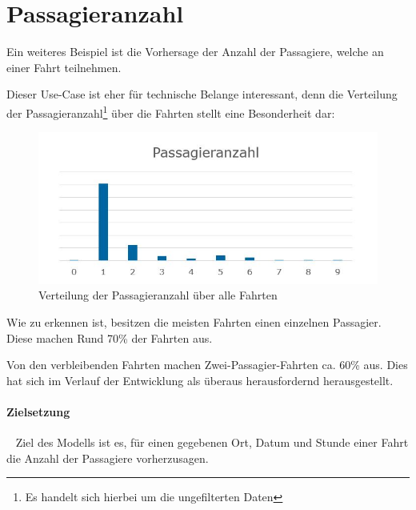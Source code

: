 \section{Passagieranzahl}
\label{sec:PasPred}
Ein weiteres Beispiel ist die Vorhersage der Anzahl der Passagiere, welche an einer Fahrt teilnehmen. 

Dieser Use-Case ist eher für technische Belange interessant, denn die Verteilung der Passagieranzahl\footnote{Es handelt sich hierbei um die ungefilterten Daten} über die Fahrten stellt eine Besonderheit dar: 


\begin{figure}[h]
	\begin{center}
		\includegraphics[width=0.8\linewidth]{Bilder/PassagierVerteilung}
		\caption[Verteilung der Passagieranzahl]{Verteilung der Passagieranzahl über alle Fahrten}
		\label{fig:PassagierVerteilung}
	\end{center}
\end{figure}


Wie zu erkennen ist, besitzen die meisten Fahrten einen einzelnen Passagier. Diese machen Rund 70\% der Fahrten aus.

Von den verbleibenden Fahrten machen Zwei-Passagier-Fahrten ca. 60\% aus.  Dies hat sich im Verlauf der Entwicklung als überaus herausfordernd herausgestellt. 
\paragraph{Zielsetzung} ~\newline
Ziel des Modells ist es, für einen gegebenen Ort, Datum und Stunde einer Fahrt die Anzahl der Passagiere vorherzusagen. 
 
